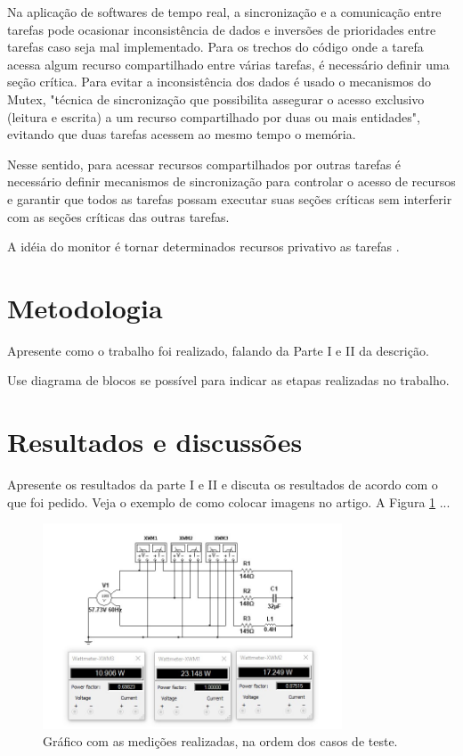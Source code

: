 \documentclass[journal]{IEEEtran}
\begin{document}
Na aplicação de softwares de tempo real, a sincronização e a comunicação entre tarefas pode ocasionar inconsistência de dados e inversões de prioridades entre tarefas caso seja mal implementado. Para os trechos do código onde a tarefa acessa algum recurso compartilhado entre várias tarefas, é necessário definir uma seção crítica. Para evitar a inconsistência dos dados é usado o mecanismos do Mutex, "técnica de sincronização que possibilita assegurar o acesso exclusivo (leitura e escrita) a um recurso compartilhado por duas ou mais entidades"\cite{IEEEhowto:Borges}, evitando que duas tarefas acessem ao mesmo tempo o memória. 

Nesse sentido, para acessar recursos compartilhados por outras tarefas é necessário definir mecanismos de sincronização para controlar o acesso de recursos e garantir que todos as tarefas possam executar suas seções críticas sem interferir com as seções críticas das outras tarefas.

A idéia do monitor é tornar determinados recursos privativo as tarefas \cite{IEEEhowto:romulo}.
\section{Metodologia}

Apresente como o trabalho foi realizado, falando da Parte I e II da descrição. 

Use diagrama de blocos se possível para indicar as etapas realizadas no trabalho.

\section{Resultados e discussões}

Apresente os resultados da parte I e II e discuta os resultados de acordo com o que foi pedido. Veja o exemplo de como colocar imagens no artigo. A Figura \ref{fig1} ...

	\begin{figure}[h]
	\centering
	\includegraphics[width=3.5in]{Imagens/medidas.jpg}	
	\caption{Gráfico com as medições realizadas, na ordem dos casos de teste.}
	\label{fig1}
\end{figure}
\end{document}
